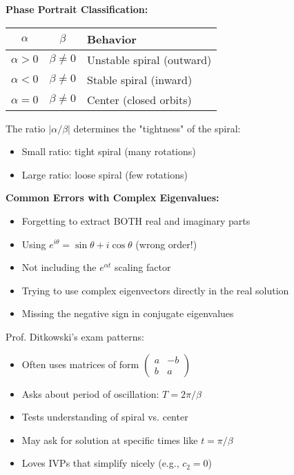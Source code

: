 \documentclass[12pt]{article}
\begin{document}
\begin{insight}
\textbf{Phase Portrait Classification:}
\begin{center}
\begin{tabular}{|c|c|l|}
\hline
$\alpha$ & $\beta$ & Behavior \\
\hline
$\alpha > 0$ & $\beta \neq 0$ & Unstable spiral (outward) \\
$\alpha < 0$ & $\beta \neq 0$ & Stable spiral (inward) \\
$\alpha = 0$ & $\beta \neq 0$ & Center (closed orbits) \\
\hline
\end{tabular}
\end{center}

The ratio $|\alpha/\beta|$ determines the "tightness" of the spiral:
\begin{itemize}
\item Small ratio: tight spiral (many rotations)
\item Large ratio: loose spiral (few rotations)
\end{itemize}
\end{insight}

\begin{warning}
\textbf{Common Errors with Complex Eigenvalues:}
\begin{itemize}
\item Forgetting to extract BOTH real and imaginary parts
\item Using $e^{i\theta} = \sin\theta + i\cos\theta$ (wrong order!)
\item Not including the $e^{\alpha t}$ scaling factor
\item Trying to use complex eigenvectors directly in the real solution
\item Missing the negative sign in conjugate eigenvalues
\end{itemize}
\end{warning}

\begin{examtip}
Prof. Ditkowski's exam patterns:
\begin{itemize}
\item Often uses matrices of form $\begin{pmatrix} a & -b \\ b & a \end{pmatrix}$
\item Asks about period of oscillation: $T = 2\pi/\beta$
\item Tests understanding of spiral vs. center
\item May ask for solution at specific times like $t = \pi/\beta$
\item Loves IVPs that simplify nicely (e.g., $c_{2} = 0$)
\end{itemize}
\end{examtip}
\end{document}
